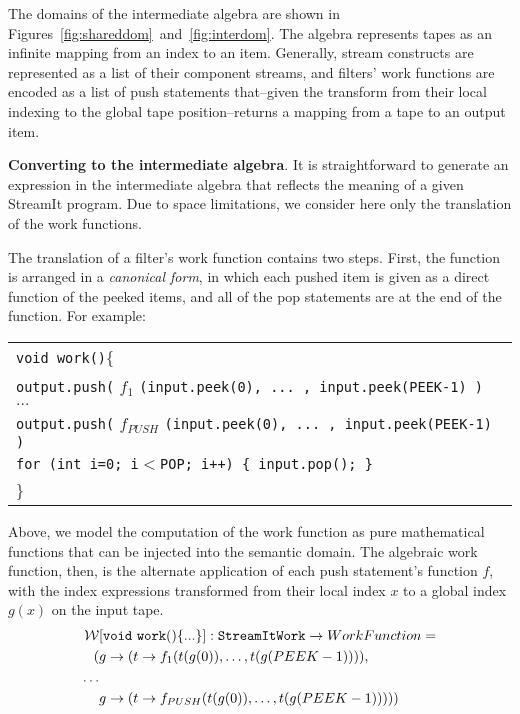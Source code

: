 The domains of the intermediate algebra are shown in
Figures~\ref{fig:shareddom}~and~\ref{fig:interdom}.  The algebra
represents tapes as an infinite mapping from an index to an item.
Generally, stream constructs are represented as a list of their
component streams, and filters' work functions are encoded as a list of
push statements that--given the transform from their local indexing to
the global tape position--returns a mapping from a tape to an output
item.

{\bf Converting to the intermediate algebra}.  It is straightforward
to generate an expression in the intermediate algebra that reflects
the meaning of a given StreamIt program.  Due to space limitations, we
consider here only the translation of the work functions.

The translation of a filter's work function contains two steps.  First,
the function is arranged in a {\it canonical form}, in which each pushed
item is given as a direct function of the peeked items, and all of the
pop statements are at the end of the function.  For example: \\
\vspace{0.2in}
\begin{scriptsize}
\begin{tabular}{l}
{\tt void work()}\{ \\
\hspace{12pt} {\tt output.push(} $f_1$ {\tt (input.peek(0), ... , input.peek(PEEK-1) )} \\
\hspace{12pt} $\dots$ \\
\hspace{12pt} {\tt output.push(} $f_{PUSH}$ {\tt (input.peek(0), ... , input.peek(PEEK-1) )} \\
\hspace{12pt} {\tt for (int i=0; i$<$POP; i++) \{ input.pop(); \}} \\
\}
\vspace{-12pt}
\end{tabular}
\end{scriptsize}
Above, we model the computation of the work function as pure
mathematical functions that can be injected into the semantic domain.
The algebraic work function, then, is the alternate application of each
push statement's function $f$, with the index expressions transformed
from their local index $x$ to a global index $g(x)$ on the input tape.
\begin{align*}
{\cal W}&[{\tt void~work() \{...\}}]: {\tt StreamIt Work} \ra
WorkFunction = \\
(&g \ra (t \ra f_1(t(g(0)), \dots , t(g(PEEK-1)))), \\
\dots \\
&g \ra (t \ra f_{PUSH}(t(g(0)), \dots , t(g(PEEK-1)))))
\end{align*}

